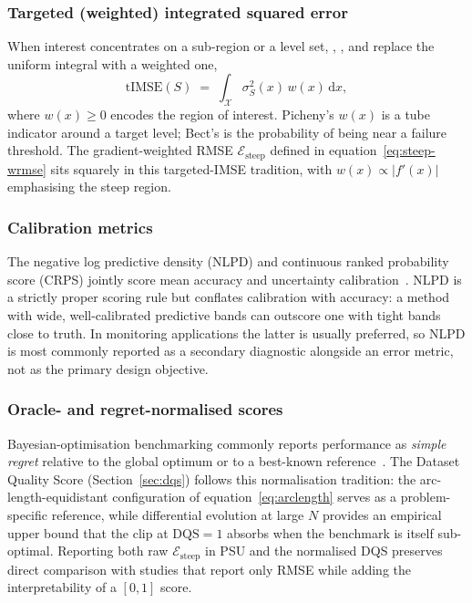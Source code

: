 \documentclass[11pt,letterpaper]{article}
\begin{document}
\subsubsection{Targeted (weighted) integrated squared error}
When interest concentrates on a sub-region or a level set,
\citet{williams2000sequential}, \citet{picheny2010adaptive}, and
\citet{bect2012sequential} replace the uniform integral with a weighted
one,
\begin{equation}
\label{eq:tIMSE}
\mathrm{tIMSE}(S)\;=\;\int_{\mathcal{X}}
\sigma_{S}^{2}(x)\,w(x)\,\mathrm{d}x,
\end{equation}
where $w(x)\ge 0$ encodes the region of interest. Picheny's $w(x)$ is a
tube indicator around a target level; Bect's is the probability of being
near a failure threshold. The gradient-weighted RMSE
$\mathcal{E}_{\text{steep}}$ defined in equation~\eqref{eq:steep-wrmse}
sits squarely in this targeted-IMSE tradition, with
$w(x)\propto|f'(x)|$ emphasising the steep region.

\subsubsection{Calibration metrics}
The negative log predictive density (NLPD) and continuous ranked
probability score (CRPS) jointly score mean accuracy and uncertainty
calibration~\citep{gneiting2007strictly,marchant2012bayesian,binois2019replication}.
NLPD is a strictly proper scoring rule but conflates calibration with
accuracy: a method with wide, well-calibrated predictive bands can
outscore one with tight bands close to truth. In monitoring
applications the latter is usually preferred, so NLPD is most commonly
reported as a secondary diagnostic alongside an error metric, not as
the primary design objective.

\subsubsection{Oracle- and regret-normalised scores}
Bayesian-optimisation benchmarking commonly reports performance as
\emph{simple regret} relative to the global optimum or to a best-known
reference~\citep{frazier2018tutorial}. The Dataset Quality Score
(Section~\ref{sec:dqs}) follows this normalisation tradition: the
arc-length-equidistant configuration of equation~\eqref{eq:arclength}
serves as a problem-specific reference, while differential evolution at
large $N$ provides an empirical upper bound that the clip at
$\mathrm{DQS}=1$ absorbs when the benchmark is itself sub-optimal.
Reporting both raw $\mathcal{E}_{\text{steep}}$ in PSU and the
normalised DQS preserves direct comparison with studies that report
only RMSE while adding the interpretability of a $[0,1]$ score.
\end{document}
